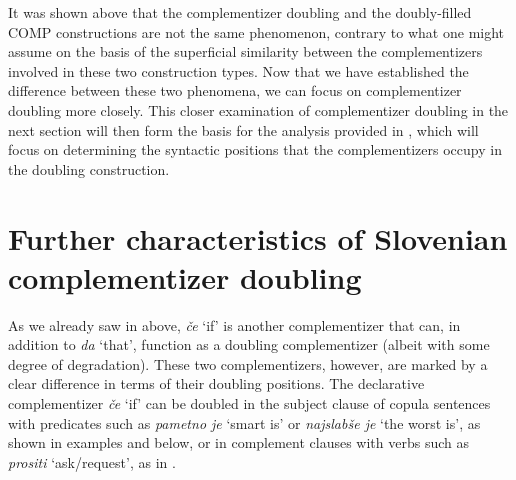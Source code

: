 \documentclass[output=paper,
]{langscibook}
\begin{document}
It was shown above that the complementizer doubling and the doubly-filled COMP constructions are not the same phenomenon, contrary to what one might assume on the basis of the superficial similarity between the complementizers involved in these two construction types. Now that we have established the difference between these two phenomena, we can focus on complementizer doubling more closely. This closer examination of complementizer doubling in the next section will then form the basis for the analysis provided in , which will focus on determining the syntactic positions that the complementizers occupy in the doubling construction.


\section{Further characteristics of Slovenian complementizer doubling}\label{sec:plesnicar:s4}

As we already saw in  above, \textit{če} `if' is another complementizer that can, in addition to \textit{da} `that', function as a doubling complementizer (albeit with some degree of degradation). These two complementizers, however, are marked by a clear difference in terms of their doubling positions. The declarative complementizer \textit{če} `if' can be doubled in the subject clause of copula sentences with predicates such as \textit{pametno je} `smart is' or \textit{najslabše je} `the worst is', as shown in examples  and  below, or in complement clauses with verbs such as \textit{prositi} `ask/request', as in . 

\begin{exe} 
\end{exe}

\begin{exe} 
\end{exe}
\end{document}
